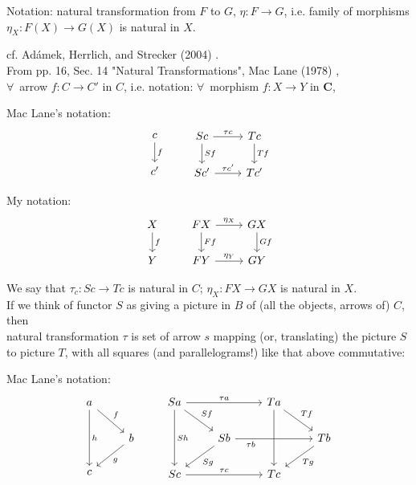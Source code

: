\documentclass[10pt]{amsart}
\begin{document}
\begin{multicols*}{2}
Notation: natural transformation from $F$ to $G$, $\eta:F \to G$, i.e. family of morphisms $\eta_X : F(X) \to G(X)$ is natural in $X$.

cf. Ad\'{a}mek, Herrlich, and Strecker (2004) \cite{AHS2004}.  \\

From pp. 16, Sec. 14 "Natural Transformations", Mac Lane (1978) \cite{MacL1978}, \\

$\forall \,$ arrow $f: C \to C'$ in $C$, i.e. notation: $\forall \, $ morphism $f:X \to Y$ in $\mathbf{C}$, 

Mac Lane's notation:
\[
\begin{gathered}
\begin{tikzcd} 
c \arrow{d}{f} \\
c'
\end{tikzcd} \qquad \, 
\begin{tikzcd}
Sc \arrow{d}{Sf} \arrow{r}{\tau c} & Tc \arrow{d}{Tf} \\
Sc' \arrow{r}{\tau c'} & Tc'
\end{tikzcd}
\end{gathered}
\]

My notation:
\[
\begin{gathered}
\begin{tikzcd} 
X \arrow{d}{f} \\
Y
\end{tikzcd} \qquad \,
\begin{tikzcd}
FX \arrow{d}{Ff} \arrow{r}{\eta_X} & GX \arrow{d}{Gf} \\
FY \arrow{r}{\eta_Y} & GY
\end{tikzcd}
\end{gathered}
\]

We say that $\tau_c : Sc \to Tc$ is natural in $C$; $\eta_X : FX \to GX$ is natural in $X$. \\

If we think of functor $S$ as giving a picture in $B$ of (all the objects, arrows of) $C$, then \\
natural transformation $\tau$ is set of arrow $s$ mapping (or, translating) the picture $S$ to picture $T$, with all squares (and parallelograms!) like that above commutative:

Mac Lane's notation:
\[
\begin{gathered}
\begin{tikzcd}
a \arrow{dr}{f} \arrow{dd}{h} & \\
& b \arrow{dl}{g} \\ 
c & 
\end{tikzcd} \qquad \, 
\begin{tikzcd}
Sa \arrow{dr}{Sf} \arrow{dd}{Sh} \arrow{rr}{\tau a} & & Ta \arrow[dd, crossing over]{} \arrow{dr}{Tf} &  \\
& Sb \arrow{dl}{Sg} \arrow{rr}[swap, pos=0.2]{\tau b} & & Tb \arrow{dl}{Tg} \\ 
Sc \arrow{rr}{\tau c} & & Tc & 
\end{tikzcd} 
\end{gathered}
\]


\end{multicols*}
\end{document}
